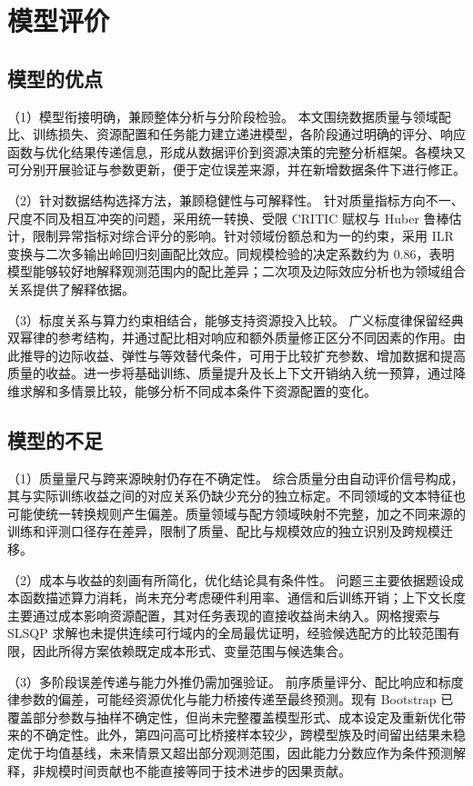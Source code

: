 \documentclass[bwprint]{gmcmthesis}
\numberwithin{equation}{section}
\numberwithin{figure}{section}
\numberwithin{table}{section}
\begin{document}
\section{模型评价}  %
    \subsection{模型的优点}
    （1）模型衔接明确，兼顾整体分析与分阶段检验。
    本文围绕数据质量与领域配比、训练损失、资源配置和任务能力建立递进模型，各阶段通过明确的评分、响应函数与优化结果传递信息，形成从数据评价到资源决策的完整分析框架。各模块又可分别开展验证与参数更新，便于定位误差来源，并在新增数据条件下进行修正。
    
    （2）针对数据结构选择方法，兼顾稳健性与可解释性。
    针对质量指标方向不一、尺度不同及相互冲突的问题，采用统一转换、受限 CRITIC 赋权与 Huber 鲁棒估计，限制异常指标对综合评分的影响。针对领域份额总和为一的约束，采用 ILR 变换与二次多输出岭回归刻画配比效应。同规模检验的决定系数约为 0.86，表明模型能够较好地解释观测范围内的配比差异；二次项及边际效应分析也为领域组合关系提供了解释依据。
    
    （3）标度关系与算力约束相结合，能够支持资源投入比较。
    广义标度律保留经典双幂律的参考结构，并通过配比相对响应和额外质量修正区分不同因素的作用。由此推导的边际收益、弹性与等效替代条件，可用于比较扩充参数、增加数据和提高质量的收益。进一步将基础训练、质量提升及长上下文开销纳入统一预算，通过降维求解和多情景比较，能够分析不同成本条件下资源配置的变化。

    \subsection{模型的不足}
    （1）质量量尺与跨来源映射仍存在不确定性。
    综合质量分由自动评价信号构成，其与实际训练收益之间的对应关系仍缺少充分的独立标定。不同领域的文本特征也可能使统一转换规则产生偏差。质量领域与配方领域映射不完整，加之不同来源的训练和评测口径存在差异，限制了质量、配比与规模效应的独立识别及跨规模迁移。
    
    （2）成本与收益的刻画有所简化，优化结论具有条件性。
    问题三主要依据题设成本函数描述算力消耗，尚未充分考虑硬件利用率、通信和后训练开销；上下文长度主要通过成本影响资源配置，其对任务表现的直接收益尚未纳入。网格搜索与 SLSQP 求解也未提供连续可行域内的全局最优证明，经验候选配方的比较范围有限，因此所得方案依赖既定成本形式、变量范围与候选集合。
    
    （3）多阶段误差传递与能力外推仍需加强验证。
    前序质量评分、配比响应和标度律参数的偏差，可能经资源优化与能力桥接传递至最终预测。现有 Bootstrap 已覆盖部分参数与抽样不确定性，但尚未完整覆盖模型形式、成本设定及重新优化带来的不确定性。此外，第四问高可比桥接样本较少，跨模型族及时间留出结果未稳定优于均值基线，未来情景又超出部分观测范围，因此能力分数应作为条件预测解释，非规模时间贡献也不能直接等同于技术进步的因果贡献。
\end{document}
